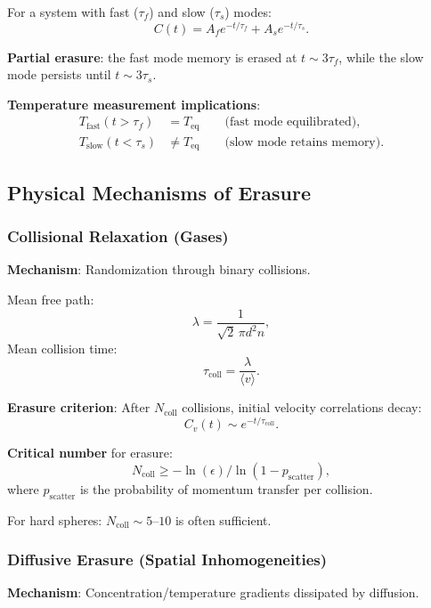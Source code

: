 \documentclass[11pt]{article}
\theoremstyle{defstyle}
\theoremstyle{mapstyle}
\begin{document}
For a system with fast ($\tau_f$) and slow ($\tau_s$) modes:
\begin{equation}
C(t) = A_f e^{-t/\tau_f} + A_s e^{-t/\tau_s}.
\end{equation}

\textbf{Partial erasure}: the fast mode memory is erased at $t \sim 3\tau_f$, while the slow mode persists until $t \sim 3\tau_s$.

\textbf{Temperature measurement implications}:
\begin{align}
T_{\text{fast}}(t > \tau_f) &= T_{\text{eq}} \qquad \text{(fast mode equilibrated)},\\
T_{\text{slow}}(t < \tau_s) &\neq T_{\text{eq}} \qquad \text{(slow mode retains memory)}.
\end{align}

\subsection{Physical Mechanisms of Erasure}

\subsubsection{Collisional Relaxation (Gases)}

\textbf{Mechanism}: Randomization through binary collisions.

Mean free path:
\[
\lambda = \frac{1}{\sqrt{2}\, \pi d^2 n},
\]
Mean collision time:
\[
\tau_{\text{coll}} = \frac{\lambda}{\langle v \rangle}.
\]

\textbf{Erasure criterion}: After $N_{\text{coll}}$ collisions, initial velocity correlations decay:
\[
C_v(t) \sim e^{-t/\tau_{\text{coll}}}.
\]

\textbf{Critical number} for erasure:
\begin{equation}
\boxed{N_{\text{coll}} \geq -\ln(\epsilon)\big/\ln(1 - p_{\text{scatter}}),}
\end{equation}
where $p_{\text{scatter}}$ is the probability of momentum transfer per collision.

For hard spheres: $N_{\text{coll}} \sim 5$--$10$ is often sufficient.

\subsubsection{Diffusive Erasure (Spatial Inhomogeneities)}

\textbf{Mechanism}: Concentration/temperature gradients dissipated by diffusion.
\end{document}
